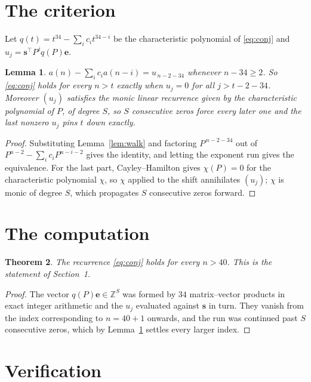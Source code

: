 \documentclass[11pt,a4paper]{article}
\theoremstyle{plain}
\newtheorem{theorem}{Theorem}
\newtheorem{lemma}[theorem]{Lemma}
\theoremstyle{definition}
\begin{document}
\section{The criterion}

Let $q(t)=t^{34}-\sum_i c_i t^{34-i}$ be the characteristic polynomial of
\eqref{eq:conj} and $u_j=\mathbf{s}^{\!\top}P^{j}q(P)\mathbf{e}$.

\begin{lemma}\label{lem:crit}
$a(n)-\sum_i c_i a(n-i)=u_{\,n-2-34}$ whenever $n-34\ge2$. So \eqref{eq:conj}
holds for every $n>t$ exactly when $u_j=0$ for all $j>t-2-34$. Moreover $(u_j)$
satisfies the monic linear recurrence given by the characteristic polynomial of $P$, of
degree $S$, so $S$ consecutive zeros force every later one and the last nonzero $u_j$ pins
$t$ down exactly.
\end{lemma}

\begin{proof}
Substituting Lemma~\ref{lem:walk} and factoring $P^{\,n-2-34}$ out of
$P^{n-2}-\sum_i c_i P^{n-i-2}$ gives the identity, and letting the exponent run gives the
equivalence. For the last part, Cayley--Hamilton gives $\chi(P)=0$ for the characteristic
polynomial $\chi$, so $\chi$ applied to the shift annihilates $(u_j)$; $\chi$ is monic of
degree $S$, which propagates $S$ consecutive zeros forward.
\end{proof}

\section{The computation}

\begin{theorem}
The recurrence \eqref{eq:conj} holds for every $n>40$. This is the statement of
Section~1.
\end{theorem}

\begin{proof}
The vector $q(P)\mathbf{e}\in\mathbb{Z}^{S}$ was formed by $34$ matrix--vector
products in exact integer arithmetic and the $u_j$ evaluated against $\mathbf{s}$ in turn.
They vanish from the index corresponding to $n=40+1$ onwards, and the run was continued
past $S$ consecutive zeros, which by Lemma~\ref{lem:crit} settles every larger index.
\end{proof}

\section{Verification}
\end{document}

